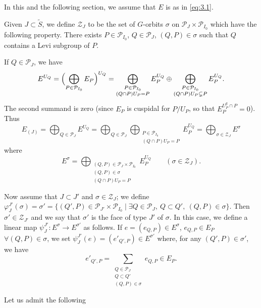 \documentclass[12pt,a4paper]{article}
\theoremstyle{plain}
\theoremstyle{definition}
\theoremstyle{remark}
\newcommand{\cP}{\mathcal{P}}
\providecommand{\cP}{\mathcal{P}}
\providecommand{\cZ}{\mathcal{Z}}
\begin{document}
In this and the following section, we assume that $E$ is as in \eqref{eq:3.1}.

Given $J \subset \tilde{S}$, we define $\cZ_J$ to be the set of $G$-orbits $\sigma$ on $\cP_J \times \cP_{I_0}$ which have the following property. There exists $P \in \cP_{I_0}$, $Q \in \cP_J$, $(Q,P) \in \sigma$ such that $Q$ contains a Levi subgroup of $P$.

If $Q \in \cP_J$, we have
\begin{equation*}
E^{U_Q} = \Bigl(\bigoplus_{P \in \cP_{I_0}} E_P\Bigr)^{U_Q} = \bigoplus_{\substack{P \in \cP_{I_0} \\ (Q \cap P)U_P = P}} E_P^{U_Q} \oplus \bigoplus_{\substack{P \in \cP_{I_0} \\ (Q \cap P)U_P \subsetneq P}} E_P^{U_Q}.
\end{equation*}
The second summand is zero (since $E_P$ is cuspidal for $P/U_P$, so that $E_P^{U_P^g \cap P} = 0$). Thus
\begin{equation}\label{eq:3.2}
E_{(J)} = \bigoplus_{Q \in \cP_J} E^{U_Q} = \bigoplus_{Q \in \cP_J} \bigoplus_{\substack{P \in \cP_{I_0} \\ (Q \cap P)U_P = P}} E_P^{U_Q} = \bigoplus_{\sigma \in \cZ_J} E^\sigma
\end{equation}
where
\begin{equation*}
E^\sigma = \bigoplus_{\substack{(Q,P) \in \cP_J \times \cP_{I_0} \\ (Q,P) \in \sigma \\ (Q \cap P)U_P = P}} E_P^{U_Q} \qquad (\sigma \in \cZ_J).
\end{equation*}

Now assume that $J \subset J'$ and $\sigma \in \cZ_J$; we define $\varphi_J^{J'}(\sigma) = \sigma' = \{(Q',P) \in \cP_{J'} \times \cP_{I_0} \mid \exists Q \in \cP_J,\ Q \subset Q',\ (Q,P) \in \sigma\}$. Then $\sigma' \in \cZ_{J'}$ and we say that $\sigma'$ is the face of type $J'$ of $\sigma$. In this case, we define a linear map $\psi_J^{J'} \colon E^\sigma \to E^{\sigma'}$ as follows. If $e = (e_{Q,P}) \in E^\sigma$, $e_{Q,P} \in E_P$ $\forall (Q,P) \in \sigma$, we set $\psi_J^{J'}(e) = (e'_{Q',P}) \in E^{\sigma'}$ where, for any $(Q',P) \in \sigma'$, we have
\begin{equation*}
e'_{Q',P} = \sum_{\substack{Q \in \cP_J \\ Q \subset Q' \\ (Q,P) \in \sigma}} e_{Q,P} \in E_P.
\end{equation*}

Let us admit the following
\end{document}
